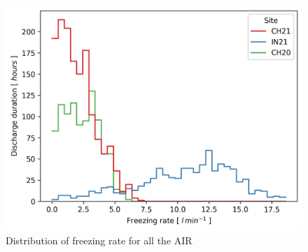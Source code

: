 \documentclass[utf8]{frontiersSCNS} %
\begin{document}
\begin{figure} \begin{center} \includegraphics[width=\linewidth]{Figures/freeze_rate.jpg} \end{center}
\caption{ Distribution of freezing rate for all the AIR } \label{fig:freeze_rate} \end{figure}
\end{document}
